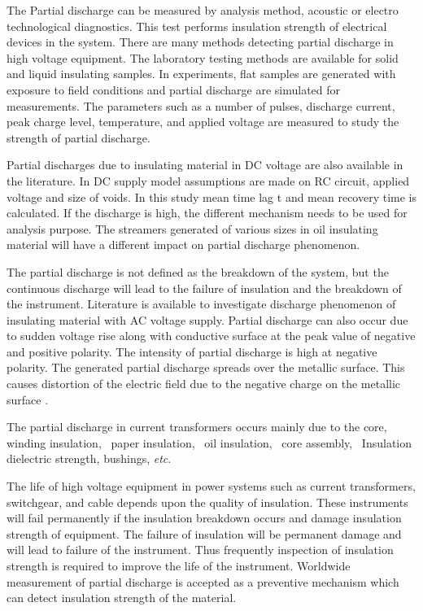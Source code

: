 The Partial discharge can be measured by analysis method, acoustic or electro technological diagnostics. This test performs insulation strength of electrical devices in the system. There are many methods detecting partial discharge in high voltage equipment. The laboratory testing methods are available for solid and liquid insulating samples. In experiments, flat samples are generated with exposure to field conditions and partial discharge are simulated for measurements. The parameters such as a number of pulses, discharge current, peak charge level, temperature, and applied voltage are measured to study the strength of partial discharge.

Partial discharges due to insulating material in DC voltage are also available in the literature. In DC supply model assumptions are made on RC circuit, applied voltage and size of voids. In this study mean time lag t and mean recovery time is calculated. If the discharge is high, the different mechanism needs to be used for analysis purpose. The streamers generated of various sizes in oil insulating material will have a different impact on partial discharge phenomenon.

The partial discharge is not defined as the breakdown of the system, but the continuous discharge will lead to the failure of insulation and the breakdown of the instrument. Literature is available to investigate discharge phenomenon of insulating material with AC voltage supply. Partial discharge can also occur due to sudden voltage rise along with conductive surface at the peak value of negative and positive polarity. The intensity of partial discharge is high at negative polarity. The generated partial discharge spreads over the metallic surface. This causes distortion of the electric field due to the negative charge on the metallic surface \cite{karmakar2009detection}.

The partial discharge in current transformers occurs mainly due to the core, winding insulation, ~paper insulation, ~oil insulation, ~core assembly, ~Insulation dielectric strength, bushings, \textit{etc}.

The life of high voltage equipment in power systems such as current transformers, switchgear, and cable depends upon the quality of insulation. These instruments will fail permanently if the insulation breakdown occurs and damage insulation strength of equipment. The failure of insulation will be permanent damage and will lead to failure of the instrument. Thus frequently inspection of insulation strength is required to improve the life of the instrument. Worldwide measurement of partial discharge is accepted as a preventive mechanism which can detect insulation strength of the material.

